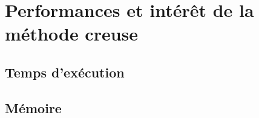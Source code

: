 \section{Performances et intérêt de la méthode creuse}

\subsection{Temps d'exécution}


\subsection{Mémoire}
